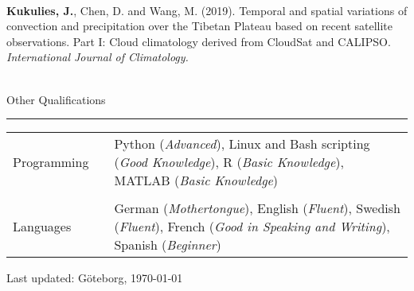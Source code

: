 \documentclass[a4paper,12pt]{article}
\begin{document}
\begin{titlepage}
\begin{table}[h!]
        \\[-1.7ex]


    \textbf{Kukulies, J.}, Chen, D. and Wang, M. (2019). Temporal and spatial variations of convection and precipitation over the Tibetan Plateau based on recent satellite observations. Part I: Cloud climatology derived from CloudSat and CALIPSO. \textit{International Journal of Climatology.}\\
    \\[-1.7ex]

\end{table}


\flushtop
\flushleft\large Other Qualifications
\\[-2ex]
\rule{1\textwidth}{0.7pt}

\begin{table}[h!]
	\begin{tabular}{p{3.7cm}p{1cm}|p{11cm}}
		Programming & &  Python (\textit{Advanced}), Linux and Bash scripting (\textit{Good Knowledge}), R (\textit{Basic Knowledge}), MATLAB (\textit{Basic Knowledge})\\
		& & \\	[-2.5ex]
		Languages & & German (\textit{Mothertongue}), English (\textit{Fluent}), Swedish (\textit{Fluent}), French (\textit{Good in Speaking and Writing}), Spanish (\textit{Beginner}) \\
	\end{tabular}
\end{table}






		

\flushright\small Last updated: G\"{o}teborg, \today

\end{titlepage}
\end{document}
